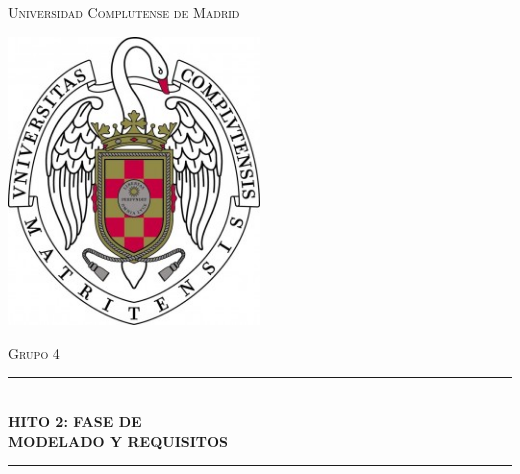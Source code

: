 \documentclass[12pt]{article}
\begin{document}
\begin{titlepage}

\newcommand{\HRule}{\rule{\linewidth}{0.5mm}} 

\center %
 
 

\textsc{\LARGE Universidad Complutense de Madrid}\\[0.1cm] %

\begin{center}
	\centering
	\includegraphics[width=0.5\textwidth]{logo}
\end{center}
 
 

\textsc{\LARGE Grupo 4}\\[0.1cm] %



\HRule \\[0.4cm]
{ \huge \bfseries HITO 2: FASE DE }\\[0.4cm] %
{ \huge \bfseries MODELADO Y REQUISITOS}\\[0.2cm] %
\HRule \\[1.2cm]
 

\end{titlepage}
\end{document}
